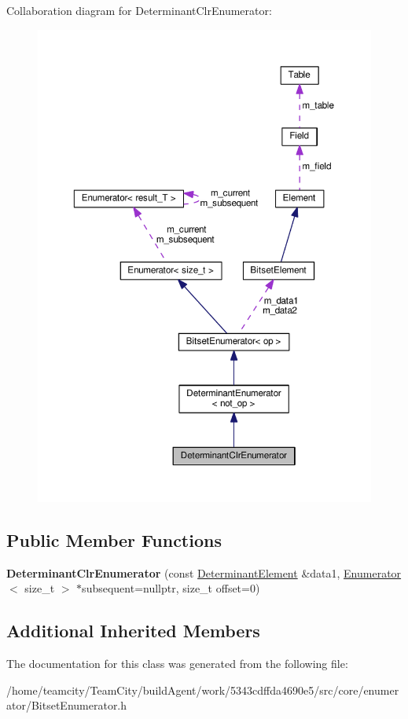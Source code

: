 Collaboration diagram for Determinant\+Clr\+Enumerator\+:
\nopagebreak
\begin{figure}[H]
\begin{center}
\leavevmode
\includegraphics[width=350pt]{classDeterminantClrEnumerator__coll__graph}
\end{center}
\end{figure}
\subsection*{Public Member Functions}
\begin{DoxyCompactItemize}
\item 
{\bfseries Determinant\+Clr\+Enumerator} (const \hyperlink{classDeterminantElement}{Determinant\+Element} \&data1, \hyperlink{classEnumerator}{Enumerator}$<$ size\+\_\+t $>$ $\ast$subsequent=nullptr, size\+\_\+t offset=0)\hypertarget{classDeterminantClrEnumerator_ac62b7f64a2dd7e40b30545cf0d9344df}{}\label{classDeterminantClrEnumerator_ac62b7f64a2dd7e40b30545cf0d9344df}

\end{DoxyCompactItemize}
\subsection*{Additional Inherited Members}


The documentation for this class was generated from the following file\+:\begin{DoxyCompactItemize}
\item 
/home/teamcity/\+Team\+City/build\+Agent/work/5343cdffda4690e5/src/core/enumerator/Bitset\+Enumerator.\+h\end{DoxyCompactItemize}
